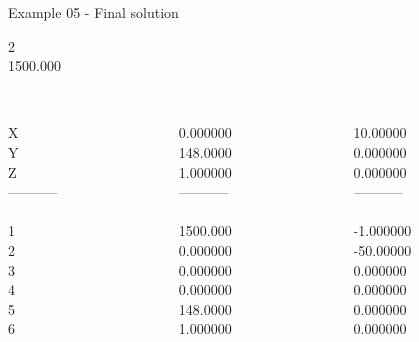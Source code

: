 \begin{frame}{Example 05 - Final solution}

  2\\
  1500.000\\

\begin{columns}[t]
\begin{column}{0.3\textwidth}
\\
X\\
Y\\
Z\\
-----------\\
\\
1\\
2\\
3\\
4\\
5\\
6\\

\end{column}
\begin{column}{0.3\textwidth}
\\
0.000000 \\
148.0000\\
1.000000\\

-----------\\
\\
1500.000\\
0.000000\\
0.000000\\
0.000000\\
148.0000\\
1.000000\\

\end{column}

\begin{column}{0.3\textwidth}
\\
10.00000\\
0.000000\\
0.000000\\

-----------\\
\\
-1.000000\\
-50.00000\\
0.000000\\
0.000000\\
0.000000\\
0.000000\\
\end{column}
\end{columns}
\end{frame}

